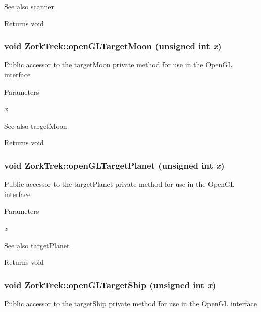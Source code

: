\begin{DoxySeeAlso}{See also}
scanner
\end{DoxySeeAlso}
\begin{DoxyReturn}{Returns}
void 
\end{DoxyReturn}
\hypertarget{classZorkTrek_a1c9ef271699144b716a83ddc550c54b5}{
\subsubsection[{openGLTargetMoon}]{\setlength{\rightskip}{0pt plus 5cm}void ZorkTrek::openGLTargetMoon (unsigned int {\em x})}}
\label{d6/df9/classZorkTrek_a1c9ef271699144b716a83ddc550c54b5}
Public accessor to the targetMoon private method for use in the OpenGL interface


\begin{DoxyParams}{Parameters}
\item[{\em x}]\end{DoxyParams}
\begin{DoxySeeAlso}{See also}
targetMoon
\end{DoxySeeAlso}
\begin{DoxyReturn}{Returns}
void 
\end{DoxyReturn}
\hypertarget{classZorkTrek_abc6d826f529f4681211a4ca76112d007}{
\subsubsection[{openGLTargetPlanet}]{\setlength{\rightskip}{0pt plus 5cm}void ZorkTrek::openGLTargetPlanet (unsigned int {\em x})}}
\label{d6/df9/classZorkTrek_abc6d826f529f4681211a4ca76112d007}
Public accessor to the targetPlanet private method for use in the OpenGL interface


\begin{DoxyParams}{Parameters}
\item[{\em x}]\end{DoxyParams}
\begin{DoxySeeAlso}{See also}
targetPlanet
\end{DoxySeeAlso}
\begin{DoxyReturn}{Returns}
void 
\end{DoxyReturn}
\hypertarget{classZorkTrek_a8f33cd71700aa48a7b173557d2922228}{
\subsubsection[{openGLTargetShip}]{\setlength{\rightskip}{0pt plus 5cm}void ZorkTrek::openGLTargetShip (unsigned int {\em x})}}
\label{d6/df9/classZorkTrek_a8f33cd71700aa48a7b173557d2922228}
Public accessor to the targetShip private method for use in the OpenGL interface



